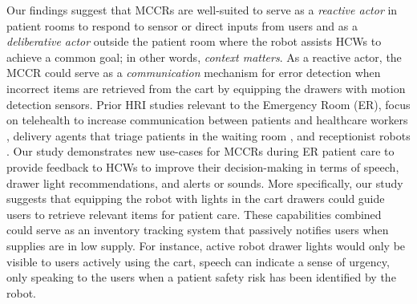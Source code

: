 Our findings suggest that MCCRs are well-suited to serve as a \textit{reactive actor} in patient rooms to respond to sensor or direct inputs from users and as a \textit{deliberative actor} outside the patient room where the robot assists HCWs to achieve a common goal; in other words, \textit{context matters}. %
As a reactive actor, the MCCR could serve as a \textit{communication} mechanism for error detection when incorrect items are retrieved from the cart by equipping the drawers with motion detection sensors. %
Prior HRI studies relevant to the Emergency Room (ER), focus on telehealth to increase communication between patients and healthcare workers \cite{matsumoto2023robot}, delivery agents that triage patients in the waiting room \cite{wilkes2010heterogeneous}, and receptionist robots \cite{ahn2015healthcare}.
Our study demonstrates new use-cases for MCCRs during ER patient care to provide feedback to HCWs to improve their decision-making in terms of speech, drawer light recommendations, and alerts or sounds. 
More specifically, our study suggests that equipping the robot with lights in the cart drawers could guide users to retrieve relevant items for patient care. 
These capabilities combined could serve as an inventory tracking system that passively notifies users when supplies are in low supply. 
For instance, active robot drawer lights would only be visible to users actively using the cart, speech can indicate a sense of urgency, only speaking to the users when a patient safety risk has been identified by the robot. 

